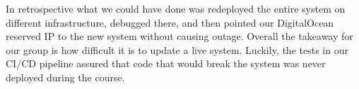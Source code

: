 In retrospective what we could have done was redeployed the entire system on different infrastructure, debugged there, and then pointed our DigitalOcean reserved IP to the new system without causing outage. Overall the takeaway for our group is how difficult it is to update a live system. Luckily, the tests in our CI/CD pipeline assured that code that would break the system was never deployed during the course.




